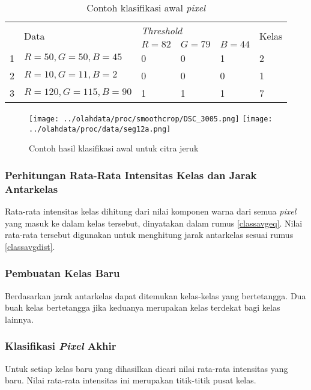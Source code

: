 \documentclass[laporan.tex]{subfiles}
\begin{document}
\begin{table}[h]
\centering
\begin{tabular}{|l|l|l|l|l|l|}
\cline{1-6}
\multirow{2}{*}{} & \multirow{2}{*}{Data} & \multicolumn{3}{l|}{\emph{Threshold}} & \multirow{2}{*}{Kelas} \\
\cline{3-5}
 & & $R=82$ & $G=79$ & $B=44$ & \\
\cline{1-6}
1 & $R=50, G=50, B=45$ & 0 & 0 & 1 & 2 \\
2 & $R=10, G=11, B=2$ & 0 & 0 & 0 & 1 \\
3 & $R=120, G=115, B=90$ & 1 & 1 & 1 & 7 \\
\cline{1-6}
\end{tabular}
\caption{Contoh klasifikasi awal \emph{pixel}}
\label{table:preclass3}
\end{table}

\begin{figure}[h]
\centering
\texttt{[image: ../olahdata/proc/smoothcrop/DSC\_3005.png]} \qquad
\texttt{[image: ../olahdata/proc/data/seg12a.png]}
\caption{Contoh hasil klasifikasi awal untuk citra jeruk}
\label{fig:preclassex}
\end{figure}

\subsubsection{Perhitungan Rata-Rata Intensitas Kelas dan Jarak Antarkelas}

Rata-rata intensitas kelas dihitung dari nilai komponen warna dari semua \emph{pixel} yang masuk ke dalam kelas tersebut, dinyatakan dalam rumus \ref{classavgeq}. Nilai rata-rata tersebut digunakan untuk menghitung jarak antarkelas sesuai rumus \ref{classavgdist}.

\subsubsection{Pembuatan Kelas Baru}

Berdasarkan jarak antarkelas dapat ditemukan kelas-kelas yang bertetangga. Dua buah kelas bertetangga jika keduanya merupakan kelas terdekat bagi kelas lainnya.

\subsubsection{Klasifikasi \emph{Pixel} Akhir}

Untuk setiap kelas baru yang dihasilkan dicari nilai rata-rata intensitas yang baru. Nilai rata-rata intensitas ini merupakan titik-titik pusat kelas.
\end{document}
